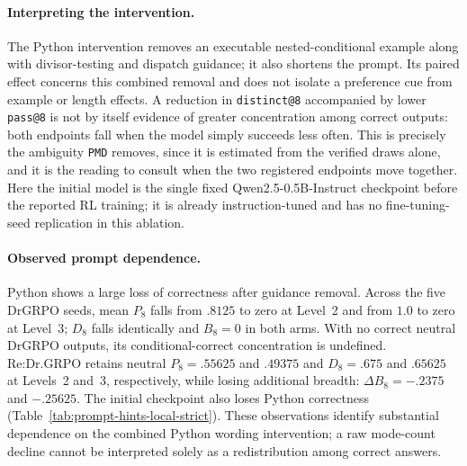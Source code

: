 \documentclass{article}
\newcommand{\1}{\mathbf 1}
\newcommand{\pmd}{\texttt{PMD}}
\theoremstyle{remark}
\theoremstyle{definition}
\theoremstyle{plain}
\begin{document}
\paragraph{Interpreting the intervention.}
The Python intervention removes an executable nested-conditional example
along with divisor-testing and dispatch guidance; it also shortens the prompt.
Its paired effect concerns this combined removal and does not isolate a
preference cue from example or length effects. A reduction in
\texttt{distinct@8} accompanied by lower \texttt{pass@8} is not by itself
evidence of greater concentration among correct outputs: both endpoints fall
when the model simply succeeds less often. This is precisely the ambiguity
\pmd{} removes, since it is estimated from the verified draws alone, and it is
the reading to consult when the two registered endpoints move together.
Here the initial model is the single fixed Qwen2.5-0.5B-Instruct checkpoint
before the reported RL training; it is already instruction-tuned and has no
fine-tuning-seed replication in this ablation.


\paragraph{Observed prompt dependence.}
Python shows a large loss of correctness after guidance removal. Across the
five DrGRPO seeds, mean $P_8$ falls from $.8125$ to zero at Level~2 and from
$1.0$ to zero at Level~3; $D_8$ falls identically and $B_8=0$ in both arms.
With no correct neutral DrGRPO outputs, its conditional-correct concentration
is undefined. Re:Dr.GRPO retains neutral $P_8=.55625$ and $.49375$ and
$D_8=.675$ and $.65625$ at Levels~2 and~3, respectively, while losing
additional breadth: $\Delta B_8=-.2375$ and $-.25625$. The initial checkpoint
also loses Python correctness (Table~\ref{tab:prompt-hints-local-strict}).
These observations identify substantial dependence on the combined Python
wording intervention; a raw mode-count decline cannot be interpreted solely
as a redistribution among correct answers.
\end{document}
